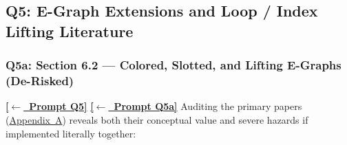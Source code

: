 \documentclass[12pt]{article}
\newcommand{\ansback}[2]{\hyperlink{#1}{\textcolor{qpurple}{\textbf{\small[\(\leftarrow\)~#2]}}}}
\begin{document}
\subsection{Q5: E-Graph Extensions and Loop / Index Lifting Literature}
\label{ans:5}

\subsubsection{Q5a: Section 6.2 --- Colored, Slotted, and Lifting E-Graphs (De-Risked)}
\label{ans:5a}

\ansback{q:5}{Prompt Q5} \ansback{q:5a}{Prompt Q5a}
Auditing the primary papers (\hyperref[sec:app-a]{Appendix~A}) reveals both their conceptual value and severe hazards if implemented literally together:
\end{document}
